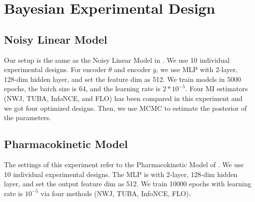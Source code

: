\documentclass{article}
\theoremstyle{plain}
\theoremstyle{definition}
\theoremstyle{remark}
\begin{document}
\begin{figure}[t!]
\begin{minipage}{.35\textwidth}
					\end{minipage}
					\vspace{-1.em}
				\end{figure}
				
				
				
				\section{Bayesian Experimental Design}
				
				\subsection{Noisy Linear Model}
				Our setup is the same as the Noisy Linear Model in \citep{kleinegesse2020bayesian}. We use 10  individual experimental designs. For encoder $\theta$ and encoder $y$, we use MLP with 2-layer, 128-dim hidden layer, and set the feature dim as 512. We train models in 5000 epochs, the batch size is 64, and the learning rate is $2*10^{-5}$. Four MI estimators (NWJ, TUBA, InfoNCE, and FLO) has been compared in this experiment and we got four optimized designs. Then, we use MCMC to estimate the posterior of the parameters.
				
				\subsection{Pharmacokinetic Model}
				The settings of this experiment refer to the Pharmacokinetic Model of \citep{kleinegesse2020bayesian}. We use 10  individual experimental designs. The MLP is with 2-layer, 128-dim hidden layer, and set the output feature dim as 512. We train 10000 epochs with learning rate is $10^{-5}$ via four methods (NWJ, TUBA, InfoNCE, FLO).
				
\end{document}
